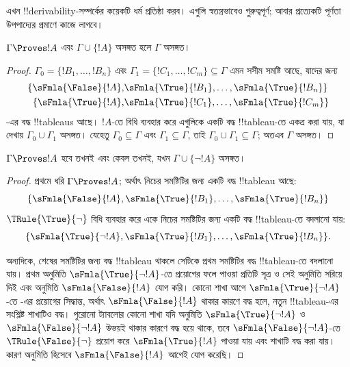 \documentclass[../../../include/open-logic-section]{subfiles}
\begin{document}
      {}
      {}


এখন !!{derivability}-সম্পর্কের কয়েকটি ধর্ম প্রতিষ্ঠা করব। এগুলি
স্বতন্ত্রভাবেও গুরুত্বপূর্ণ; আবার প্রত্যেকটি পূর্ণতা উপপাদ্যের
প্রমাণে কাজে লাগবে।

\begin{prop}
  $\Gamma \Proves !A$ এবং $\Gamma \cup \{!A\}$ অসঙ্গত হলে
  $\Gamma$ অসঙ্গত।
\end{prop}

\begin{proof}
$\Gamma_0=\{!B_1,\dots,!B_n\}$ এবং
$\Gamma_1=\{!C_1,\dots,!C_m\}\subseteq\Gamma$ এমন সসীম সমষ্টি আছে,
যাদের জন্য
  \begin{align*}
    \{\sFmla{\False}{!A}, &
    \sFmla{\True}{!B_1}, \dots, \sFmla{\True}{!B_n}\} \\
    \{\sFmla{\True}{!A}, &
    \sFmla{\True}{!C_1}, \dots, \sFmla{\True}{!C_m}\}
  \end{align*}
-এর বদ্ধ !!{tableau}s আছে। $!A$-তে \Cut{} বিধি ব্যবহার করে এগুলিকে
একটি বদ্ধ !!{tableau}-তে একত্র করা যায়, যা দেখায়
$\Gamma_0\cup\Gamma_1$ অসঙ্গত। যেহেতু
$\Gamma_0\subseteq\Gamma$ এবং $\Gamma_1\subseteq\Gamma$, তাই
$\Gamma_0\cup\Gamma_1\subseteq\Gamma$; অতএব $\Gamma$ অসঙ্গত।
\end{proof}

\begin{prop}
$\Gamma \Proves !A$ হবে তখনই এবং কেবল তখনই, যখন
$\Gamma \cup \{\lnot !A\}$ অসঙ্গত।
\end{prop}

\begin{proof}
প্রথমে ধরি $\Gamma \Proves !A$; অর্থাৎ নিচের সমষ্টিটির জন্য একটি
বদ্ধ !!{tableau} আছে:
\[
\{\sFmla{\False}{!A},
\sFmla{\True}{!B_1}, \dots, \sFmla{\True}{!B_n}\}
\]
$\TRule{\True}{\lnot}$ বিধি ব্যবহার করে একে নিচের সমষ্টিটির জন্য
একটি বদ্ধ !!{tableau}-তে বদলানো যায়:
\[
\{\sFmla{\True}{\lnot !A},
\sFmla{\True}{!B_1}, \dots, \sFmla{\True}{!B_n}\}.
\]

অন্যদিকে, শেষের সমষ্টিটির জন্য বদ্ধ !!{tableau} থাকলে সেটিকে প্রথম
সমষ্টিটির বদ্ধ !!{tableau}-তে বদলানো যায়। প্রথম অনুমিতি
$\sFmla{\True}{\lnot !A}$-তে \TRule{\True}{\lnot} প্রয়োগের ফলে
পাওয়া প্রতিটি সূত্র ও সেই অনুমিতি সরিয়ে দিই এবং অনুমিতি
$\sFmla{\False}{!A}$ যোগ করি। কোনো শাখা আগে
$\sFmla{\True}{\lnot !A}$-তে \TRule{\True}{\lnot}-এর প্রয়োগের সিদ্ধান্ত, অর্থাৎ
$\sFmla{\False}{!A}$ থাকার কারণে বদ্ধ হলে, নতুন !!{tableau}-এর
সংশ্লিষ্ট শাখাটিও বদ্ধ। পুরোনো ট্যাবলোর কোনো শাখা যদি অনুমিতি
$\sFmla{\True}{\lnot !A}$ ও $\sFmla{\False}{\lnot !A}$ উভয়ই থাকার
কারণে বদ্ধ হয়ে থাকে, তবে $\sFmla{\False}{\lnot !A}$-তে
$\TRule{\False}{\lnot}$ প্রয়োগ করে $\sFmla{\True}{!A}$ পাওয়া যায়
এবং শাখাটি বদ্ধ করা যায়। কারণ অনুমিতি হিসেবে
$\sFmla{\False}{!A}$ আগেই যোগ করেছি।
\end{proof}
\end{document}
